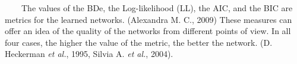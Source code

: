 ~~~~The values of the BDe, the Log-likelihood (LL), the AIC, and the BIC are metrics for the learned networks. (Alexandra M. C., 2009) These measures can offer an idea of the quality of the networks from different points of view. In all four cases, the higher the value of the metric, the better the network. (D. Heckerman \emph{et al.}, 1995, Silvia A. \emph{et al.}, 2004).
